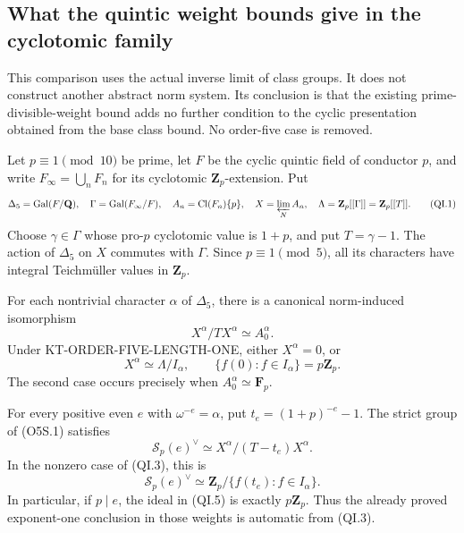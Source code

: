 \subsection{What the quintic weight bounds give in the cyclotomic family}
\label{sec:kt-quintic-iwasawa-specialization}

This comparison uses the actual inverse limit of class groups.  It
does not construct another abstract norm system.  Its conclusion is
that the existing prime-divisible-weight bound adds no further
condition to the cyclic presentation obtained from the base class
bound.  No order-five case is removed.

Let $p\equiv1\pmod {10}$ be prime, let $F$ be the cyclic quintic
field of conductor $p$, and write $F_\infty=\bigcup_nF_n$ for its
cyclotomic $\mathbf Z_p$-extension.  Put
\[
 \Delta_5=\operatorname{Gal}(F/\mathbf Q),\quad
 \Gamma=\operatorname{Gal}(F_\infty/F),\quad
 A_n=\operatorname{Cl}(F_n)\{p\},\quad
 X=\varprojlim_{N}A_n,\quad
 \Lambda=\mathbf Z_p[[\Gamma]]=\mathbf Z_p[[T]].
 \tag{QI.1}
\]
Choose $\gamma\in\Gamma$ whose pro-$p$ cyclotomic value is $1+p$,
and put $T=\gamma-1$.  The action of $\Delta_5$ on $X$ commutes
with $\Gamma$.  Since $p\equiv1\pmod5$, all its characters have
integral Teichm\"uller values in $\mathbf Z_p$.

\begin{proposition}
For each nontrivial character $\alpha$ of $\Delta_5$, there is a
canonical norm-induced isomorphism
\[
                    X^\alpha/TX^\alpha\simeq A_0^\alpha.
 \tag{QI.2}
\]
Under KT-ORDER-FIVE-LENGTH-ONE, either $X^\alpha=0$, or
\[
       X^\alpha\simeq\Lambda/I_\alpha,\qquad
       \{f(0):f\in I_\alpha\}=p\mathbf Z_p.             \tag{QI.3}
\]
The second case occurs precisely when $A_0^\alpha\simeq\mathbf F_p$.

For every positive even $e$ with $\omega^{-e}=\alpha$, put
$t_e=(1+p)^{-e}-1$.  The strict group of (O5S.1) satisfies
\[
 \mathcal S_p(e)^\vee\simeq
       X^\alpha/(T-t_e)X^\alpha.
 \tag{QI.4}
\]
In the nonzero case of (QI.3), this is
\[
 \mathcal S_p(e)^\vee\simeq
   \mathbf Z_p/\{f(t_e):f\in I_\alpha\}.                \tag{QI.5}
\]
In particular, if $p\mid e$, the ideal in (QI.5) is exactly
$p\mathbf Z_p$.  Thus the already proved exponent-one conclusion
in those weights is automatic from (QI.3).
\end{proposition}

